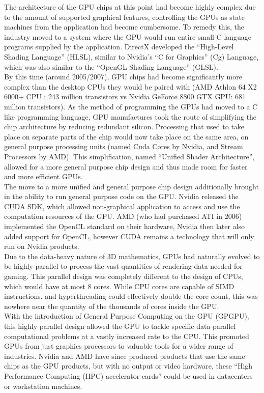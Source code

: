 \documentclass[12pt,a4paper]{article}
\begin{document}
The architecture of the GPU chips at this point had become highly complex due to the amount of supported graphical features, controlling the GPUs as state machines from the application had become cumbersome. To remedy this, the industry moved to a system where the GPU would run entire small C language programs supplied by the application. DirectX developed the “High-Level Shading Language” (HLSL), similar to Nvidia’s “C for Graphics” (Cg) Language, which was also similar to the “OpenGL Shading Language” (GLSL).
\\
By this time (around 2005/2007), GPU chips had become significantly more complex than the desktop CPUs they would be paired with (AMD Athlon 64 X2 6000+ CPU : 243 million transistors vs Nvidia GeForce 8800 GTX GPU: 681 million transistors). As the method of programming the GPUs had moved to a C like programming language, GPU manufactures took the route of simplifying the chip architecture by reducing redundant silicon. Processing that used to take place on separate parts of the chip would now take place on the same area, on general purpose processing units (named Cuda Cores by Nvidia, and Stream Processors by AMD). This simplification, named “Unified Shader Architecture”, allowed for a more general purpose chip design and thus made room  for faster and more efficient GPUs. 
\\
The move to a more unified and general purpose chip design additionally brought in the ability to run general purpose code on the GPU. Nvidia released the CUDA SDK, which allowed non-graphical application to access and use the computation resources of the GPU. AMD (who had purchased ATI in 2006) implemented the OpenCL standard on their hardware, Nvidia then later also added support for OpenCL, however CUDA remains a technology that will only run on Nvidia products.
\\
Due to the data-heavy nature of 3D mathematics, GPUs had naturally evolved to be highly parallel to process the vast quantities of rendering data needed for gaming. This parallel design was completely different to the design of CPUs, which would have at most 8 cores. While CPU cores are capable of SIMD instructions, and hyperthreading could effectively double the core count, this was nowhere near the quantity of the thousands of cores inside the GPU. 
\\
With the introduction of General Purpose Computing on the GPU (GPGPU), this highly parallel design allowed the GPU to tackle specific data-parallel computational problems at a vastly increased rate to the CPU. This promoted GPUs from just graphics processors to valuable tools for a wider range of industries. Nvidia and AMD have since produced products that use the same chips as the GPU products, but with no output or video hardware, these “High Performance Computing (HPC) accelerator cards” could be used in datacenters or workstation machines.
\end{document}

